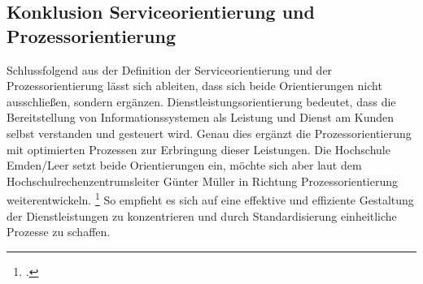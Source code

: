 \subsection{Konklusion Serviceorientierung und Prozessorientierung}
Schlussfolgend aus der Definition der Serviceorientierung und der Prozessorientierung lässt sich ableiten, dass sich beide Orientierungen nicht ausschließen, sondern ergänzen.  Dienstleistungsorientierung bedeutet, dass die Bereitstellung von Informationssystemen als Leistung und Dienst am Kunden selbst verstanden und gesteuert wird. Genau dies ergänzt die Prozessorientierung mit optimierten Prozessen zur Erbringung dieser Leistungen. 
Die Hochschule Emden/Leer setzt beide Orientierungen ein, möchte sich aber laut dem Hochschulrechenzentrumsleiter Günter Müller in Richtung Prozessorientierung weiterentwickeln. \footcite{gunter_muller_interview} So empfieht es sich auf eine effektive und effiziente Gestaltung der Dienstleistungen zu konzentrieren und durch Standardisierung einheitliche Prozesse zu schaffen.

